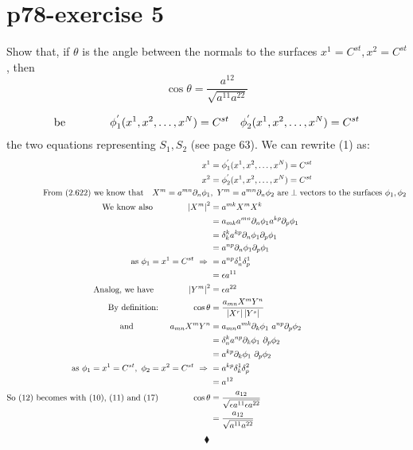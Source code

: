 \section{p78-exercise 5}
\begin{tcolorbox}
Show that, if $\theta$ is the angle between the normals to the surfaces $x^1 = C^{st}, x^2 = C^{st}$, then $$ \cos \theta = \frac{a^{12}}{\sqrt{a^{11}a^{22}}}$$
\end{tcolorbox}
\begin{align}
\text{be}\quad\quad\quad\quad \phi^{'}_1(x^1,x^2,\dots,x^N) = C^{st} \quad \phi^{'}_2(x^1,x^2,\dots,x^N) = C^{st}
\end{align}
the two equations representing $S_1, S_2$ (see page 63). We can rewrite (1) as:
\begin{align}
\ x^1 &= \phi^{'}_1(x^1,x^2,\dots,x^N) = C^{st} \\
\ x^2 &= \phi^{'}_2(x^1,x^2,\dots,x^N) = C^{st}\\
\text{From (2.622) we know that}\quad X^m = a^{mn}\partial_n \phi_{1} & ,\ Y^m = a^{mn}\partial_n \phi_{2} \ \text{are}\perp\text{vectors to the surfaces}\  \phi_{1},\phi_{2}\\
\text{We know also} \spatie \left|X^m\right |^2 &= a^{mk}X^mX^k\\
\ & = a_{mk}a^{mn}\partial_n \phi_{1}a^{kp}\partial_p \phi_{1}\\
\ & = \delta^k_k a^{kp}\partial_n \phi_{1}\partial_p \phi_{1}\\
\ & = a^{np}\partial_n \phi_{1}\partial_p \phi_{1}\\
\text{as} \ \phi_1 = x^1 = C^{st} \ \Rightarrow \ &= a^{np}\delta^1_n \delta^1_p\\
\ &= \epsilon a^{11}\\
\text{Analog, we have}\spatie \left|Y^m\right |^2 &= \epsilon a^{22}\\
\text{By definition:}\spatie \cos\theta &= \frac{a_{mn}X^mY^n}{ \left|X^r\right | \left|Y^s\right |}\\
\text{and }\spatie a_{mn}X^mY^n &= a_{mn} a^{mk}\partial_k \phi_{1} \  a^{np}\partial_p \phi_{2}\\
\ &=\delta^k_n a^{np}\partial_k \phi_{1} \ \partial_p \phi_{2}\\
\ &=a^{kp}\partial_k \phi_{1} \ \partial_p \phi_{2}\\
\text{as} \ \phi_1 = x^1 = C^{st},  \ \phi_2 = x^2 = C^{st} \ \Rightarrow \ &= a^{kp}\delta^1_k\delta^2_p\\
\ &= a^{12}\\
\text{So (12) becomes with (10), (11) and (17)} \spatie \cos\theta &= \frac{a_{12}}{ \sqrt{\epsilon a^{11}\epsilon a^{22}}}\\
&= \frac{a_{12}}{ \sqrt{ a^{11} a^{22}}}
\end{align}
$$\blacklozenge$$
\newpage

